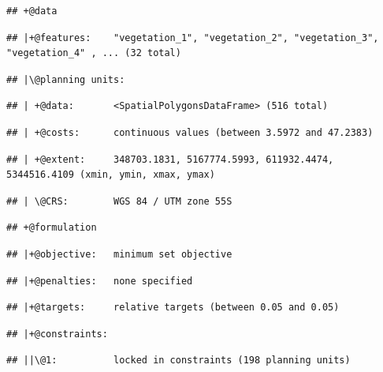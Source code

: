 \documentclass[12pt,]{book}
\begin{document}
\begin{verbatim}
## +@data
\end{verbatim}

\begin{verbatim}
## |+@features:    "vegetation_1", "vegetation_2", "vegetation_3", "vegetation_4" , ... (32 total)
\end{verbatim}

\begin{verbatim}
## |\@planning units:
\end{verbatim}

\begin{verbatim}
## | +@data:       <SpatialPolygonsDataFrame> (516 total)
\end{verbatim}

\begin{verbatim}
## | +@costs:      continuous values (between 3.5972 and 47.2383)
\end{verbatim}

\begin{verbatim}
## | +@extent:     348703.1831, 5167774.5993, 611932.4474, 5344516.4109 (xmin, ymin, xmax, ymax)
\end{verbatim}

\begin{verbatim}
## | \@CRS:        WGS 84 / UTM zone 55S
\end{verbatim}

\begin{verbatim}
## +@formulation
\end{verbatim}

\begin{verbatim}
## |+@objective:   minimum set objective
\end{verbatim}

\begin{verbatim}
## |+@penalties:   none specified
\end{verbatim}

\begin{verbatim}
## |+@targets:     relative targets (between 0.05 and 0.05)
\end{verbatim}

\begin{verbatim}
## |+@constraints:
\end{verbatim}

\begin{verbatim}
## ||\@1:          locked in constraints (198 planning units)
\end{verbatim}
\end{document}
